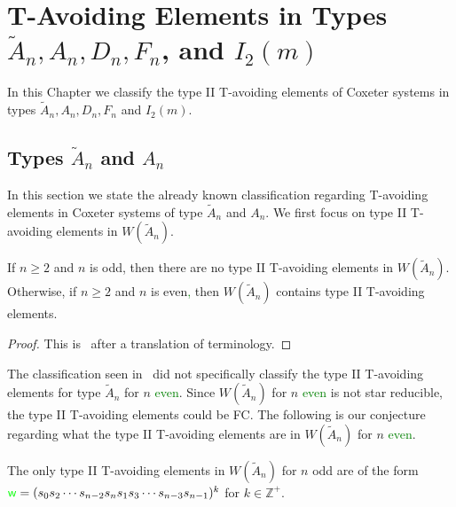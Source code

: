 \chapter{T-Avoiding Elements in Types $\widetilde{A}_n, A_n, D_n, F_n$, and $I_2(m)$}\label{chap:TandTavoid}

In this Chapter we classify the type II T-avoiding elements of Coxeter systems in types $\widetilde{A}_n, A_n, D_n, F_n$ and $I_2(m)$.


\section{Types $\widetilde{A}_n$ and $A_n$}\label{sec:tavoidA}
In this section we state the already known classification regarding T-avoiding elements in Coxeter systems of type $\widetilde{A}_n$ and $A_n$. We first focus on type II T-avoiding elements in $W(\widetilde{A}_n)$.

\begin{proposition}
 If $n \geq 2$ and $n$ is odd, then there are no type II T-avoiding elements in $W(\widetilde{A}_n)$. Otherwise, if $n \geq 2$ and $n$ is even\textcolor{green}{,} then $W(\widetilde{A}_n)$ contains type II T-avoiding elements.
\begin{proof}
	This is~\cite[Proposition~3.1.2]{Fan1999} after a translation of terminology.\qedhere
\end{proof}
\end{proposition}



The classification seen in~\cite{Fan1999} did not specifically classify the type II T-avoiding elements for type $\widetilde{A}_n$ for $n$ \textcolor{green}{even}. Since $W(\widetilde{A}_n)$ for $n$ \textcolor{green}{even} is not star reducible, the type II T-avoiding elements could be FC. The following is our conjecture regarding what the type II T-avoiding elements are in $W(\widetilde{A}_n)$ for $n$ \textcolor{green}{even}.
\begin{conjecture}
	The only type II T-avoiding elements in $W(\widetilde{A}_n)$ for $n$ odd are of the form $\textcolor{green}{\mathsf{w}}=(s_0s_2 \cdots s_{n-2}s_ns_1s_3 \cdots s_{n-3}s_{n-1})^k$  for $k \in \mathbb{Z}^+$. 
\end{conjecture} 

